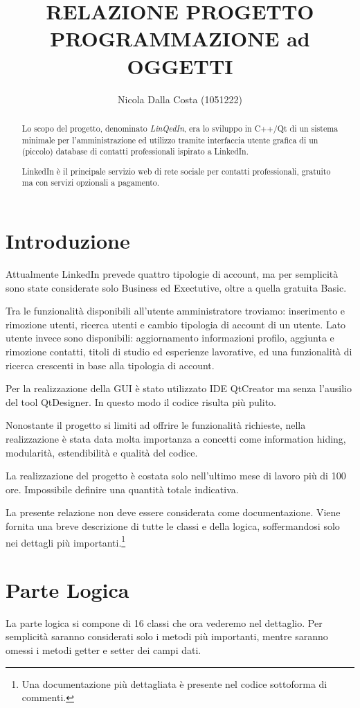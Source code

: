 \documentclass[a4paper,10pt]{article}
\title{RELAZIONE PROGETTO\\PROGRAMMAZIONE ad OGGETTI}
\author{Nicola Dalla Costa (1051222)}
\date{}
\begin{document}
\maketitle
\raggedbottom

\renewcommand\abstractname{\textit{Abstract}}
\begin{abstract}
\noindent Lo scopo del progetto, denominato \textit{LinQedIn}, era lo sviluppo in C++/Qt di un sistema minimale per l'amministrazione ed utilizzo tramite interfaccia utente grafica di un (piccolo) database di contatti professionali ispirato a LinkedIn. 

LinkedIn è il principale servizio web di rete sociale per contatti professionali, gratuito ma con servizi opzionali a pagamento.
\end{abstract}

\section*{Introduzione}
Attualmente LinkedIn prevede quattro tipologie di account, ma per semplicità sono state considerate solo Business ed Exectutive, oltre a quella gratuita Basic.

Tra le funzionalità disponibili all'utente amministratore troviamo: inserimento e rimozione utenti, ricerca utenti e cambio tipologia di account di un utente. Lato utente invece sono disponibili: aggiornamento informazioni profilo, aggiunta e rimozione contatti, titoli di studio ed esperienze lavorative, ed una funzionalità di ricerca crescenti in base alla tipologia di account.

Per la realizzazione della GUI è stato utilizzato IDE QtCreator ma senza l'ausilio del tool QtDesigner. In questo modo il codice risulta più pulito.

Nonostante il progetto si limiti ad offrire le funzionalità richieste, nella realizzazione è stata data molta importanza a concetti come information hiding, modularità, estendibilità e qualità del codice.

La realizzazione del progetto è costata solo nell'ultimo mese di lavoro più di 100 ore. Impossibile definire una quantità totale indicativa.

La presente relazione non deve essere considerata come documentazione. Viene fornita una breve descrizione di tutte le classi e della logica, soffermandosi solo nei dettagli più importanti.\footnote{Una documentazione più dettagliata è presente nel codice sottoforma di commenti.}

\section*{Parte Logica}
La parte logica si compone di 16 classi che ora vederemo nel dettaglio. Per semplicità saranno considerati solo i metodi più importanti, mentre saranno omessi i metodi getter e setter dei campi dati.
\end{document}
